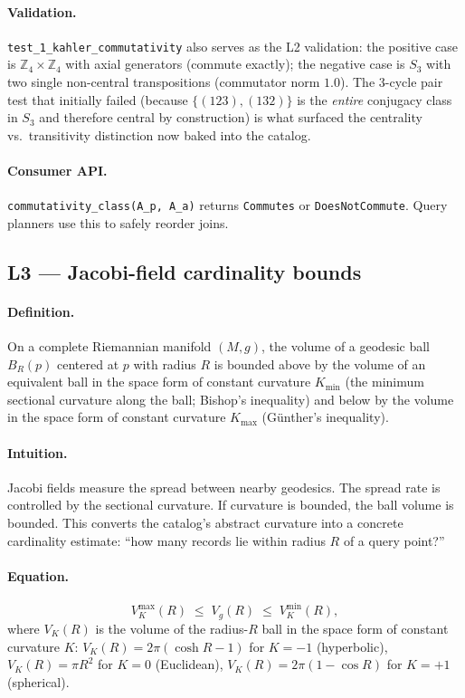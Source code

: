 \documentclass[11pt,letterpaper]{article}
\begin{document}
\paragraph{Validation.}
\texttt{test\_1\_kahler\_commutativity} also serves as the L2
validation: the positive case is $\mathbb{Z}_4 \times \mathbb{Z}_4$
with axial generators (commute exactly); the negative case is $S_3$
with two single non-central transpositions (commutator norm $1.0$).
The 3-cycle pair test that initially failed (because
$\{(123), (132)\}$ is the \emph{entire} conjugacy class in $S_3$ and
therefore central by construction) is what surfaced the centrality
vs.\ transitivity distinction now baked into the catalog.

\paragraph{Consumer API.}
\texttt{commutativity\_class(A\_p, A\_a)} returns
\texttt{Commutes} or \texttt{DoesNotCommute}. Query planners use
this to safely reorder joins.


\subsection{L3 --- Jacobi-field cardinality bounds}

\paragraph{Definition.}
On a complete Riemannian manifold $(M, g)$, the volume of a
geodesic ball $B_R(p)$ centered at $p$ with radius $R$ is bounded
above by the volume of an equivalent ball in the space form of
constant curvature $K_{\min}$ (the minimum sectional curvature
along the ball; Bishop's inequality) and below by the volume in the
space form of constant curvature $K_{\max}$ (G\"unther's
inequality).

\paragraph{Intuition.}
Jacobi fields measure the spread between nearby geodesics. The
spread rate is controlled by the sectional curvature. If curvature
is bounded, the ball volume is bounded. This converts the catalog's
abstract curvature into a concrete cardinality estimate: ``how many
records lie within radius $R$ of a query point?''

\paragraph{Equation.}
\[
V_K^{\max}(R) \;\leq\; V_g(R) \;\leq\; V_K^{\min}(R),
\]
where $V_K(R)$ is the volume of the radius-$R$ ball in the space
form of constant curvature $K$:
$V_K(R) = 2\pi (\cosh R - 1)$ for $K = -1$ (hyperbolic),
$V_K(R) = \pi R^2$ for $K = 0$ (Euclidean),
$V_K(R) = 2\pi (1 - \cos R)$ for $K = +1$ (spherical).
\end{document}
